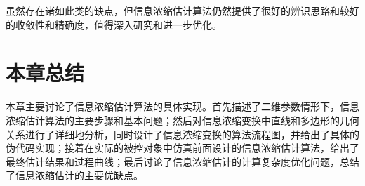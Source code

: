 虽然存在诸如此类的缺点，但信息浓缩估计算法仍然提供了很好的辨识思路和较好的收敛性和精确度，值得深入研究和进一步优化。

\section{本章总结}
本章主要讨论了信息浓缩估计算法的具体实现。首先描述了二维参数情形下，信息浓缩估计算法的主要步骤和基本问题；然后对信息浓缩变换中直线和多边形的几何关系进行了详细地分析，同时设计了信息浓缩变换的算法流程图，并给出了具体的伪代码实现；接着在实际的被控对象中仿真前面设计的信息浓缩估计算法，给出了最终估计结果和过程曲线；最后讨论了信息浓缩估计的计算复杂度优化问题，总结了信息浓缩估计的主要优缺点。